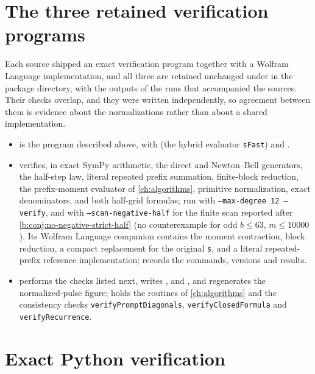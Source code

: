 \documentclass[11pt,a4paper,oneside,openany]{book}
\numberwithin{equation}{chapter}
\theoremstyle{definition}
\theoremstyle{remark}
\begin{document}
\section{The three retained verification programs}
Each source shipped an exact verification program together with a Wolfram
Language implementation, and all three are retained unchanged under
 in the package directory, with the outputs of the runs
that accompanied the sources. Their checks overlap, and they were written
independently, so agreement between them is evidence about the
normalizations rather than about a shared implementation.
\begin{itemize}
\item {} is the program described
above, with  (the hybrid evaluator
\texttt{sFast}) and .
\item {} verifies, in
exact SymPy arithmetic, the direct and Newton--Bell generators, the
half-step law, literal repeated prefix summation, finite-block reduction,
the prefix-moment evaluator of \cref{ch:algorithms}, primitive normalization,
exact denominators, and both half-grid formulas; run with
\texttt{--max-degree 12 --verify}, and with \texttt{--scan-negative-half}
for the finite scan reported after \cref{b:conj:no-negative-strict-half}
(no counterexample for odd $b\le63$, $m\le10000$). Its Wolfram Language
companion  contains the moment contraction,
block reduction, a compact replacement for the original \texttt{s}, and a
literal repeated-prefix reference implementation; 
records the commands, versions and results.
\item {} performs the checks
listed next, writes ,
 and
, and regenerates the normalized-pulse
figure;  holds the routines of
\cref{ch:algorithms} and the consistency checks
\texttt{verifyPromptDiagonals}, \texttt{verifyClosedFormula} and
\texttt{verifyRecurrence}.
\end{itemize}

\section{Exact Python verification}
\end{document}
